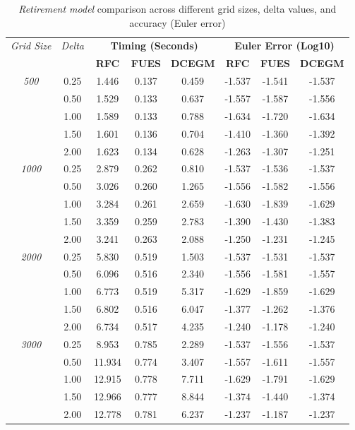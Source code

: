 
\begin{table}[htbp]
\centering
\small
\begin{tabular}{ccccc|ccc}
\toprule
\multirow{2}{*}{\textit{Grid Size}} & \multirow{2}{*}{\textit{Delta}} & \multicolumn{3}{c}{\textbf{Timing (Seconds)}} & \multicolumn{3}{c}{\textbf{Euler Error (Log10)}} \\
 & & \textbf{RFC} & \textbf{FUES} & \textbf{DCEGM} & \textbf{RFC} & \textbf{FUES} & \textbf{DCEGM} \\
\midrule
\multirow{5}{*}{\textit{500}} & 0.25 & 1.446 & 0.137 & 0.459 & -1.537 & -1.541 & -1.537 \\
 & 0.50 & 1.529 & 0.133 & 0.637 & -1.557 & -1.587 & -1.556 \\
 & 1.00 & 1.589 & 0.133 & 0.788 & -1.634 & -1.720 & -1.634 \\
 & 1.50 & 1.601 & 0.136 & 0.704 & -1.410 & -1.360 & -1.392 \\
 & 2.00 & 1.623 & 0.134 & 0.628 & -1.263 & -1.307 & -1.251 \\
\midrule
\multirow{5}{*}{\textit{1000}} & 0.25 & 2.879 & 0.262 & 0.810 & -1.537 & -1.536 & -1.537 \\
 & 0.50 & 3.026 & 0.260 & 1.265 & -1.556 & -1.582 & -1.556 \\
 & 1.00 & 3.284 & 0.261 & 2.659 & -1.630 & -1.839 & -1.629 \\
 & 1.50 & 3.359 & 0.259 & 2.783 & -1.390 & -1.430 & -1.383 \\
 & 2.00 & 3.241 & 0.263 & 2.088 & -1.250 & -1.231 & -1.245 \\
\midrule
\multirow{5}{*}{\textit{2000}} & 0.25 & 5.830 & 0.519 & 1.503 & -1.537 & -1.531 & -1.537 \\
 & 0.50 & 6.096 & 0.516 & 2.340 & -1.556 & -1.581 & -1.557 \\
 & 1.00 & 6.773 & 0.519 & 5.317 & -1.629 & -1.859 & -1.629 \\
 & 1.50 & 6.802 & 0.516 & 6.047 & -1.377 & -1.262 & -1.376 \\
 & 2.00 & 6.734 & 0.517 & 4.235 & -1.240 & -1.178 & -1.240 \\
\midrule
\multirow{5}{*}{\textit{3000}} & 0.25 & 8.953 & 0.785 & 2.289 & -1.537 & -1.556 & -1.537 \\
 & 0.50 & 11.934 & 0.774 & 3.407 & -1.557 & -1.611 & -1.557 \\
 & 1.00 & 12.915 & 0.778 & 7.711 & -1.629 & -1.791 & -1.629 \\
 & 1.50 & 12.966 & 0.777 & 8.844 & -1.374 & -1.440 & -1.374 \\
 & 2.00 & 12.778 & 0.781 & 6.237 & -1.237 & -1.187 & -1.237 \\
\midrule

\bottomrule
\end{tabular}
\caption{\textit{Retirement model} comparison across different grid sizes, delta values, and accuracy (Euler error)}
\label{tab:timing_comparison}
\end{table}
